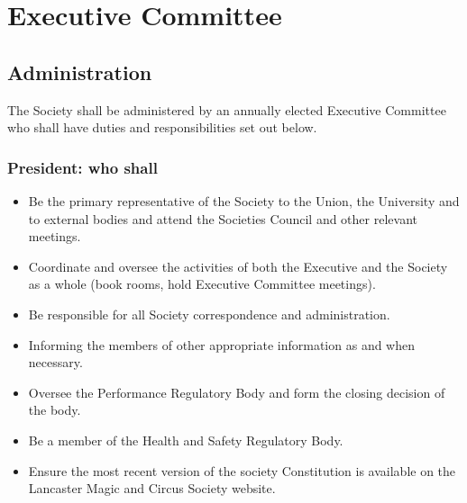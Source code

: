 \documentclass[11pt,a4paper]{article}
\begin{document}
\section{Executive Committee}\label{sec:executive}
\subsection{Administration}
The Society shall be administered by an annually elected Executive Committee who shall have duties and responsibilities set out below.

\subsubsection{President: who shall}
\begin{itemize}
    \item Be the primary representative of the Society to the Union, the University and to external bodies and attend the Societies Council and other relevant meetings.
    \item Coordinate and oversee the activities of both the Executive and the Society as a whole (book rooms, hold Executive Committee meetings).
    \item Be responsible for all Society correspondence and administration.
    \item Informing the members of other appropriate information as and when necessary.
    \item Oversee the Performance Regulatory Body and form the closing decision of the body.
    \item Be a member of the Health and Safety Regulatory Body.
    \item Ensure the most recent version of the society Constitution is available on the Lancaster Magic and Circus Society website.
\end{itemize}
\end{document}
